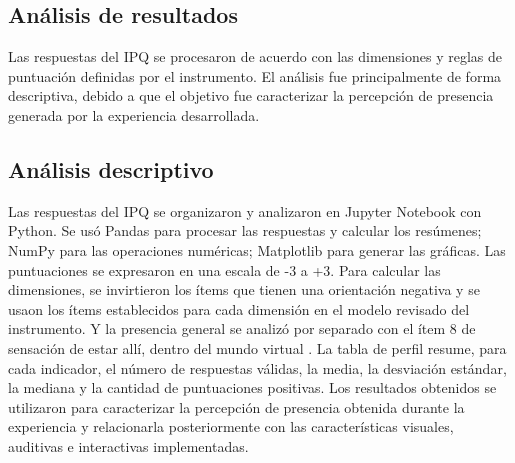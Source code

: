 \subsection{Análisis de resultados}
Las respuestas del IPQ se procesaron de acuerdo con las dimensiones y reglas de puntuación definidas por el instrumento. 
El análisis fue principalmente de forma descriptiva, debido a que el objetivo fue caracterizar la percepción de presencia generada por la experiencia desarrollada.

\subsection{Análisis descriptivo}

Las respuestas del IPQ se organizaron y analizaron en Jupyter Notebook con Python. 
Se usó Pandas para procesar las respuestas y calcular los resúmenes; 
NumPy para las operaciones numéricas; Matplotlib para generar las gráficas. 
Las puntuaciones se expresaron en una escala de -3 a +3. Para calcular las dimensiones, 
se invirtieron los ítems que tienen una orientación negativa y se usaon los ítems establecidos para cada dimensión en el modelo revisado del instrumento. 
Y la presencia general se analizó por separado con el ítem 8 de sensación de estar allí, dentro del mundo virtual \cite{castro2026immersive}. 
La tabla de perfil resume, para cada indicador, el número de respuestas válidas, la media, la desviación estándar, la mediana y la cantidad de puntuaciones positivas. 
Los resultados obtenidos se utilizaron para caracterizar la percepción de presencia obtenida durante la experiencia y relacionarla posteriormente con las características visuales, auditivas e interactivas implementadas.
